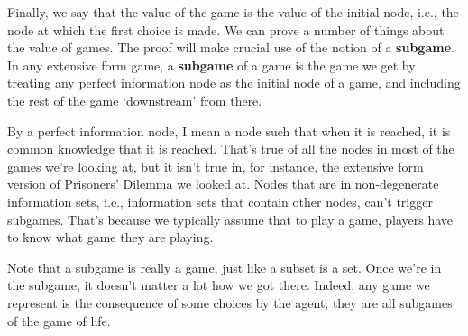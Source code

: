 \noindent Finally, we say that the value of the game is the value of the initial node, i.e., the node at which the first choice is made. We can prove a number of things about the value of games. The proof will make crucial use of the notion of a \textbf{subgame}. In any extensive form game, a \textbf{subgame} of a game is the game we get by treating any perfect information node as the initial node of a game, and including the rest of the game `downstream' from there. 

By a perfect information node, I mean a node such that when it is reached, it is common knowledge that it is reached. That's true of all the nodes in most of the games we're looking at, but it isn't true in, for instance, the extensive form version of Prisoners' Dilemma we looked at. Nodes that are in non-degenerate information sets, i.e., information sets that contain other nodes, can't trigger subgames. That's because we typically assume that to play a game, players have to know what game they are playing.

Note that a subgame is really a game, just like a subset is a set. Once we're in the subgame, it doesn't matter a lot how we got there. Indeed, any game we represent is the consequence of some choices by the agent; they are all subgames of the game of life.


